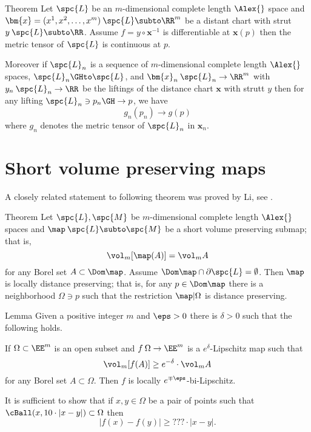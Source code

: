 \begin{thm}{Theorem}
Let $\spc{L}$ be an $m$-dimensional complete length $\Alex{}$ space
and $\bm{x}=(x^1,x^2,\dots,x^m)\:\spc{L}\subto\RR^m$ be a distant chart with strut $y\:\spc{L}\subto\RR$.
Assume $f=y\circ\bm{x}^{-1}$ is differentiable at $\bm{x}(p)$
then the metric tensor of $\spc{L}$ is continuous at $p$.

Moreover if $\spc{L}_n$ is a sequence of $m$-dimensional complete length $\Alex{}$ spaces,
$\spc{L}_n\GHto\spc{L}$,
and $\bm{x}_n\:\spc{L}_n\to\RR^m$ with $y_n\:\spc{L}_n\to\RR$ be the liftings of the distance chart $\bm{x}$ with strutt $y$ then
for any lifting $\spc{L}_n\ni p_n\GH\to p$, we have
\[g_n(p_n)\to g(p)\]
where $g_n$ denotes the metric tensor of $\spc{L}_n$ in $\bm{x}_n$.
\end{thm}




\section{Short volume preserving maps}

A closely related statement to following theorem 
was proved by Li, see \cite[Theorem A]{li}.

\begin{thm}{Theorem}\label{thm:li}
Let $\spc{L},\spc{M}$ be $m$-dimensional complete length $\Alex{}$ spaces
and $\map\:\spc{L}\subto \spc{M}$ 
be a short volume preserving submap;
that is,
\[\vol_m[\map(A)]=\vol_m A\]
for any Borel set $A\subset \Dom \map$.
Assume $\Dom\map\cap\partial\spc{L}=\emptyset$.
Then $\map$
is locally distance preserving;
that is, for any $p\in \Dom \map$
there is a neighborhood $\Omega\ni p$
such that the restriction $\map|\Omega$ is distance preserving.
\end{thm}

\begin{thm}{Lemma}\label{lem:almost-li}
Given a positive integer $m$ and $\eps>0$  
there is $\delta>0$ 
such that the following holds.

If $\Omega\subset\EE^m$ is an open subset
and $f\:\Omega\to\EE^m$ is a $e^\delta$-Lipschitz map
such that 
\[\vol_m [f(A)]\ge e^{-\delta}\cdot\vol_m A\]
for any Borel set $A\subset \Omega$.
Then $f$ is locally $e^{\mp\eps}$-bi-Lipschitz.
\end{thm}

It is sufficient to show that if $x,y\in \Omega$
be a pair of points such that $\cBall(x,10\cdot|x-y|)\subset\Omega$
then 
\[|f(x)-f(y)|\ge???\cdot|x-y|.\]

